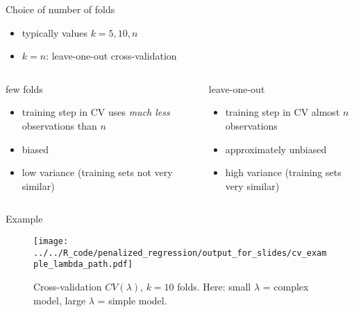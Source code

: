 \documentclass[xcolor=dvipsnames, handout]{beamer}
\begin{document}
\begin{frame}{Choice of number of folds}
\begin{itemize}
  \item typically values $k = 5, 10, n$
  \item $k = n$: leave-one-out cross-validation
\end{itemize}
\begin{columns}[t, onlytextwidth]
        \begin{block}{few folds}
        \begin{itemize}
          \item<1-> 
          training step in CV uses \emph{much less} observations than $n$
          \item<2-> 
          biased
          \item<3-> 
          low variance (training sets not very similar)
        \end{itemize}
        \end{block}
        \begin{block}{leave-one-out}
        \begin{itemize}
          \item<1-> 
          training step in CV almost $n$ observations
          \item<2-> 
          approximately unbiased
          \item<3-> 
          high variance (training sets very similar)        
        \end{itemize}
      \end{block}
\end{columns}
\end{frame}

\begin{frame}{Example}
  \begin{figure}
  \texttt{[image: ../../R\_code/penalized\_regression/output\_for\_slides/cv\_example\_lambda\_path.pdf]}
   \caption{Cross-validation $CV(\lambda)$, $k = 10$ folds. Here: small $\lambda$ = complex model, large $\lambda$ = simple model.}
\end{figure}
\end{frame}
\end{document}
